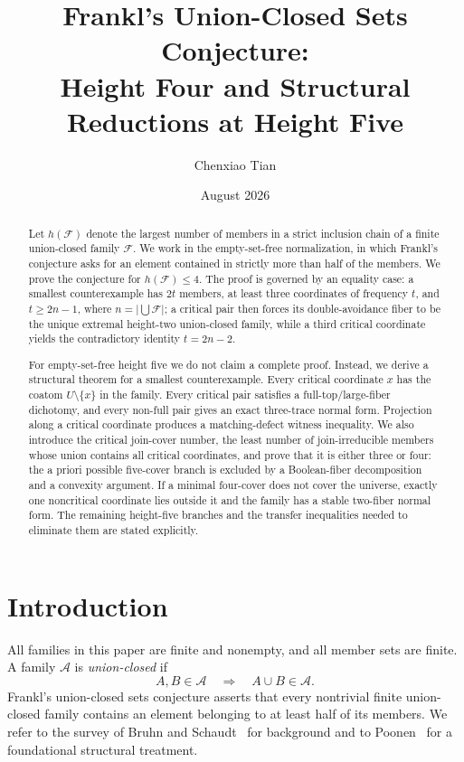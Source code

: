 \documentclass[11pt,reqno]{amsart}
\title[Height Four and Structural Reductions at Height Five]
{Frankl's Union-Closed Sets Conjecture:\\
Height Four and Structural Reductions at Height Five}
\author{Chenxiao Tian}
\date{August 2026}
\numberwithin{equation}{section}
\theoremstyle{definition}
\theoremstyle{remark}
\newcommand{\F}{\mathcal{F}}
\newcommand{\A}{\mathcal{A}}
\newcommand{\1}{\mathbf{1}}
\begin{document}
\begin{abstract}
Let $h(\F)$ denote the largest number of members in a strict inclusion chain of a finite union-closed family $\F$.  We work in the empty-set-free normalization, in which Frankl's conjecture asks for an element contained in strictly more than half of the members.  We prove the conjecture for $h(\F)\le4$.  The proof is governed by an equality case: a smallest counterexample has $2t$ members, at least three coordinates of frequency $t$, and $t\ge2n-1$, where $n=\lvert\bigcup\F\rvert$; a critical pair then forces its double-avoidance fiber to be the unique extremal height-two union-closed family, while a third critical coordinate yields the contradictory identity $t=2n-2$.

For empty-set-free height five we do not claim a complete proof.  Instead, we derive a structural theorem for a smallest counterexample.  Every critical coordinate $x$ has the coatom $U\setminus\{x\}$ in the family.  Every critical pair satisfies a full-top/large-fiber dichotomy, and every non-full pair gives an exact three-trace normal form.  Projection along a critical coordinate produces a matching-defect witness inequality.  We also introduce the critical join-cover number, the least number of join-irreducible members whose union contains all critical coordinates, and prove that it is either three or four: the a priori possible five-cover branch is excluded by a Boolean-fiber decomposition and a convexity argument.  If a minimal four-cover does not cover the universe, exactly one noncritical coordinate lies outside it and the family has a stable two-fiber normal form.  The remaining height-five branches and the transfer inequalities needed to eliminate them are stated explicitly.
\end{abstract}

\maketitle

\section{Introduction}

All families in this paper are finite and nonempty, and all member sets are finite.  A family \(\A\) is \emph{union-closed} if
\[
A,B\in\A \quad\Longrightarrow\quad A\cup B\in\A.
\]
Frankl's union-closed sets conjecture asserts that every nontrivial finite union-closed family contains an element belonging to at least half of its members.  We refer to the survey of Bruhn and Schaudt~\cite{BruhnSchaudt} for background and to Poonen~\cite{Poonen} for a foundational structural treatment.
\end{document}

